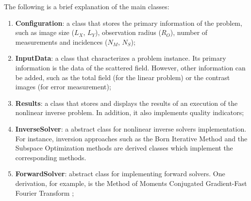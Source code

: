 			The following is a brief explanation of the main classes:
			\begin{enumerate}
				\item\textbf{Configuration}: a class that stores the primary information of the problem, such as image size ($L_X$, $L_Y$), observation radius ($R_O$), number of measurements and incidences ($N_M$, $N_S$);
				\item\textbf{InputData}: a class that characterizes a problem instance. Its primary information is the data of the scattered field. However, other information can be added, such as the total field (for the linear problem) or the contrast images (for error measurement);
				\item\textbf{Results}: a class that stores and displays the results of an execution of the nonlinear inverse problem. In addition, it also implements quality indicators;
				\item\textbf{InverseSolver}: a abstract class for nonlinear inverse solvers implementation. For instance, inversion approaches such as the Born Iterative Method and the Subspace Optimization methods are derived classes which implement the corresponding methods.
				\item\textbf{ForwardSolver}: abstract class for implementing forward solvers. One derivation, for example, is the Method of Moments Conjugated Gradient-Fast Fourier Transform \citep{su1987calculation};

\end{enumerate}
